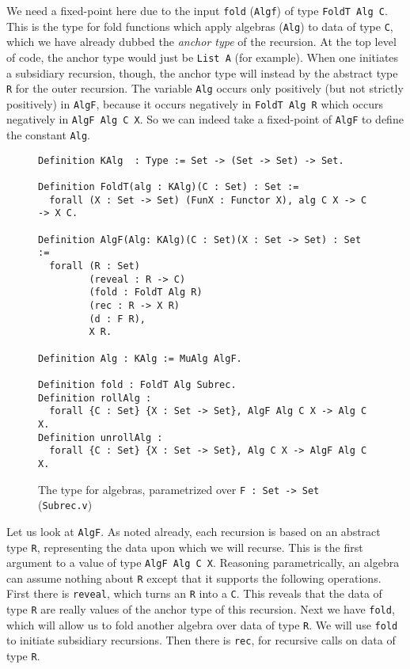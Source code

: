 \documentclass[a4paper,USenglish]{lipics-v2021}
\begin{document}
We need a fixed-point here due to the input \verb|fold| (\verb|Algf|)
of type \verb|FoldT Alg C|.  This is the type for fold functions which
apply algebras (\verb|Alg|) to data of type \verb|C|, which we have
already dubbed the \emph{anchor type} of the recursion.  At the top
level of code, the anchor type would just be \verb|List A| (for
example).  When one initiates a subsidiary recursion, though, the
anchor type will instead by the abstract type \verb|R| for the outer
recursion.  The variable \verb|Alg| occurs only positively (but not
strictly positively) in \verb|AlgF|, because it occurs negatively in
\verb|FoldT Alg R| which occurs negatively in \verb|AlgF Alg C X|.  So
we can indeed take a fixed-point of \verb|AlgF| to define the constant
\verb|Alg|.

\begin{figure}
\begin{verbatim}
Definition KAlg  : Type := Set -> (Set -> Set) -> Set.

Definition FoldT(alg : KAlg)(C : Set) : Set :=
  forall (X : Set -> Set) (FunX : Functor X), alg C X -> C -> X C.

Definition AlgF(Alg: KAlg)(C : Set)(X : Set -> Set) : Set :=
  forall (R : Set)
         (reveal : R -> C)        
         (fold : FoldT Alg R)
         (rec : R -> X R)      
         (d : F R),             
         X R.

Definition Alg : KAlg := MuAlg AlgF.

Definition fold : FoldT Alg Subrec.
Definition rollAlg :
  forall {C : Set} {X : Set -> Set}, AlgF Alg C X -> Alg C X.
Definition unrollAlg : 
  forall {C : Set} {X : Set -> Set}, Alg C X -> AlgF Alg C X.
\end{verbatim}
\caption{The type for algebras, parametrized over \texttt{F : Set -> Set} (\texttt{Subrec.v})}
\label{fig:algf}
\end{figure}


Let us look at \verb|AlgF|.  As noted already, each recursion is based
on an abstract type \verb|R|, representing the data upon which we will
recurse.  This is the first argument to a value of type
\verb|AlgF Alg C X|.  Reasoning parametrically, an algebra can assume
nothing about \verb|R| except that it supports the following
operations.  First there is \verb|reveal|, which turns an \verb|R|
into a \verb|C|.  This reveals that the data of type \verb|R| are
really values of the anchor type of this recursion.  Next we have
\texttt{fold}, which will allow us to fold another algebra over data
of type \verb|R|.  We will use \verb|fold| to initiate subsidiary
recursions.  Then there is \verb|rec|, for recursive calls on data of
type \verb|R|.
\end{document}
